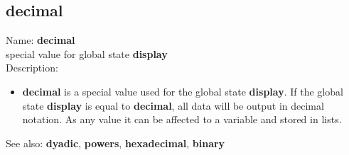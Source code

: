\subsection{ decimal }
\noindent Name: \textbf{decimal}\\
special value for global state \textbf{display}\\

\noindent Description: \begin{itemize}

\item \textbf{decimal} is a special value used for the global state \textbf{display}.
   If the global state \textbf{display} is equal to \textbf{decimal}, all data will
   be output in decimal notation.
   As any value it can be affected to a variable and stored in lists.
\end{itemize}
See also: \textbf{dyadic}, \textbf{powers}, \textbf{hexadecimal}, \textbf{binary}
